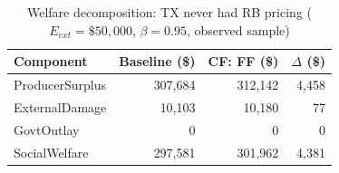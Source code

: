 \begin{table}[htbp]
\centering
\caption{Welfare decomposition: TX never had RB pricing
  ($E_{ext} = \$50{,}000$, $\beta=0.95$, observed sample)}
\label{tab:cf_welfare}
\begin{tabular}{lrrr}
\hline
Component & Baseline (\$) & CF: FF (\$) & $\Delta$ (\$) \\
\hline
ProducerSurplus & 307,684 & 312,142 & 4,458 \\
ExternalDamage & 10,103 & 10,180 & 77 \\
GovtOutlay & 0 & 0 & 0 \\
SocialWelfare & 297,581 & 301,962 & 4,381 \\
\hline
\end{tabular}
\end{table}
